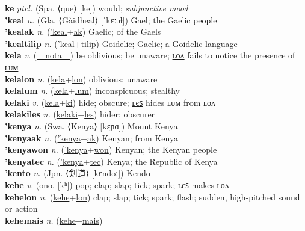 \textbf{ke} \textit{ptcl.} (Spa. ⟨que⟩ [ke])
would; \textit{subjunctive mood} \label{ke} \\
\textbf{'keal} \textit{n.} (Gla. ⟨Gàidheal⟩ [ˈkɛːəɫ])
Gael; the Gaelic people \label{'keal} \\
\textbf{'kealak} \textit{n.} (\hyperref['keal]{'keal}+\hyperref[ak]{ak})
Gaelic; of the Gaels \label{'kealak} \\
\textbf{'kealtilip} \textit{n.} (\hyperref['keal]{'keal}+\hyperref[tilip]{tilip})
Goidelic; Gaelic; a Goidelic language \label{'kealtilip} \\
\textbf{kela} \textit{v.} (\hyperref[nota]{~~nota~~})
be oblivious; be unaware; \hyperref[kelalon]{ʟᴏᴧ} fails to notice the presence of \hyperref[kelalum]{ʟᴜᴍ} \label{kela} \\
\textbf{kelalon} \textit{n.} (\hyperref[kela]{kela}+\hyperref[lon]{lon})
oblivious; unaware \label{kelalon} \\
\textbf{kelalum} \textit{n.} (\hyperref[kela]{kela}+\hyperref[lum]{lum})
inconspicuous; stealthy \label{kelalum} \\
\textbf{kelaki} \textit{v.} (\hyperref[kela]{kela}+\hyperref[ki]{ki})
hide; obscure; \hyperref[kelakiles]{ʟєꜱ} hides ʟᴜᴍ from ʟᴏᴧ \label{kelaki} \\
\textbf{kelakiles} \textit{n.} (\hyperref[kelaki]{kelaki}+\hyperref[les]{les})
hider; obscurer \label{kelakiles} \\
\textbf{'kenya} \textit{n.} (Swa. ⟨Kenya⟩ [kɛɲɑ])
Mount Kenya \label{'kenya} \\
\textbf{'kenyaak} \textit{n.} (\hyperref['kenya]{'kenya}+\hyperref[ak]{ak})
Kenyan; from Kenya \label{'kenyaak} \\
\textbf{'kenyawon} \textit{n.} (\hyperref['kenya]{'kenya}+\hyperref[won]{won})
Kenyan; the Kenyan people \label{'kenyawon} \\
\textbf{'kenyatec} \textit{n.} (\hyperref['kenya]{'kenya}+\hyperref[tec]{tec})
Kenya; the Republic of Kenya \label{'kenyatec} \\
\textbf{'kento} \textit{n.} (Jpn. ⟨剣道⟩ [kɛndoː])
Kendo \label{'kento} \\
\textbf{kehe} \textit{v.} (ono. [kʰ])
pop; clap; slap; tick; spark; ʟєꜱ makes \hyperref[kehelon]{ʟᴏᴧ} \label{kehe} \\
\textbf{kehelon} \textit{n.} (\hyperref[kehe]{kehe}+\hyperref[lon]{lon})
clap; slap; tick; spark; flash; sudden, high-pitched sound or action \label{kehelon} \\
\textbf{kehemais} \textit{n.} (\hyperref[kehe]{kehe}+\hyperref[mais]{mais})

